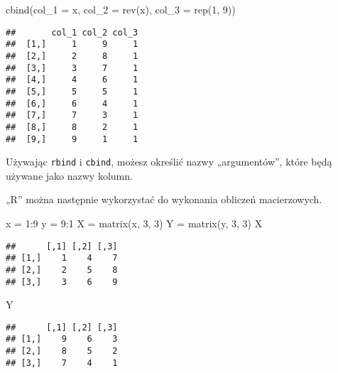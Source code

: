 \documentclass[
]{article}
\newenvironment{Shaded}{\begin{snugshade}}{\end{snugshade}}
\newcommand{\AttributeTok}[1]{\textcolor[rgb]{0.77,0.63,0.00}{#1}}
\newcommand{\DecValTok}[1]{\textcolor[rgb]{0.00,0.00,0.81}{#1}}
\newcommand{\FunctionTok}[1]{\textcolor[rgb]{0.00,0.00,0.00}{#1}}
\newcommand{\NormalTok}[1]{#1}
\newcommand{\OtherTok}[1]{\textcolor[rgb]{0.56,0.35,0.01}{#1}}
\newcommand{\SpecialCharTok}[1]{\textcolor[rgb]{0.00,0.00,0.00}{#1}}
\begin{document}
\begin{Shaded}
\begin{Highlighting}[]
\FunctionTok{cbind}\NormalTok{(}\AttributeTok{col\_1 =}\NormalTok{ x, }\AttributeTok{col\_2 =} \FunctionTok{rev}\NormalTok{(x), }\AttributeTok{col\_3 =} \FunctionTok{rep}\NormalTok{(}\DecValTok{1}\NormalTok{, }\DecValTok{9}\NormalTok{))}
\end{Highlighting}
\end{Shaded}

\begin{verbatim}
##       col_1 col_2 col_3
##  [1,]     1     9     1
##  [2,]     2     8     1
##  [3,]     3     7     1
##  [4,]     4     6     1
##  [5,]     5     5     1
##  [6,]     6     4     1
##  [7,]     7     3     1
##  [8,]     8     2     1
##  [9,]     9     1     1
\end{verbatim}

Używając \texttt{rbind} i \texttt{cbind}, możesz określić nazwy
„argumentów'', które będą używane jako nazwy kolumn.

„R'' można następnie wykorzystać do wykonania obliczeń macierzowych.

\begin{Shaded}
\begin{Highlighting}[]
\NormalTok{x }\OtherTok{=} \DecValTok{1}\SpecialCharTok{:}\DecValTok{9}
\NormalTok{y }\OtherTok{=} \DecValTok{9}\SpecialCharTok{:}\DecValTok{1}
\NormalTok{X }\OtherTok{=} \FunctionTok{matrix}\NormalTok{(x, }\DecValTok{3}\NormalTok{, }\DecValTok{3}\NormalTok{)}
\NormalTok{Y }\OtherTok{=} \FunctionTok{matrix}\NormalTok{(y, }\DecValTok{3}\NormalTok{, }\DecValTok{3}\NormalTok{)}
\NormalTok{X}
\end{Highlighting}
\end{Shaded}

\begin{verbatim}
##      [,1] [,2] [,3]
## [1,]    1    4    7
## [2,]    2    5    8
## [3,]    3    6    9
\end{verbatim}

\begin{Shaded}
\begin{Highlighting}[]
\NormalTok{Y}
\end{Highlighting}
\end{Shaded}

\begin{verbatim}
##      [,1] [,2] [,3]
## [1,]    9    6    3
## [2,]    8    5    2
## [3,]    7    4    1
\end{verbatim}
\end{document}
